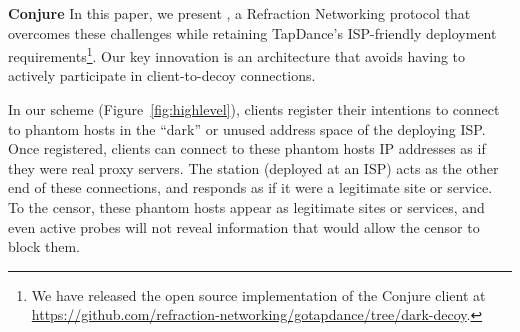 \documentclass[sigconf]{acmart}
\newcommand{\TODO}[1]{}
\renewcommand{\TODO}[1]{{\color{red} TODO: {#1}}}
\begin{document}



\smallskip
\noindent\textbf{Conjure}\enskip
In this paper, we present \scheme, a Refraction
Networking protocol that overcomes these challenges while retaining
TapDance's ISP-friendly deployment requirements\footnote{
We have released the open source implementation of the Conjure client at 
\url{https://github.com/refraction-networking/gotapdance/tree/dark-decoy}.}.
Our key innovation is an architecture that avoids
having to actively participate in client-to-decoy connections.

In our scheme (Figure~\ref{fig:highlevel}), clients
register their intentions to connect to phantom hosts in the ``dark''
or unused address space of the deploying ISP. Once registered, clients
can connect to these phantom hosts IP addresses as if they were real
proxy servers. The \scheme station (deployed at an ISP) acts as the other end of these connections, and
responds as if it were a legitimate site or service. To the censor,
these phantom hosts appear as legitimate sites or services, and even
active probes will not reveal information that would allow the censor to
block them.


\end{document}
